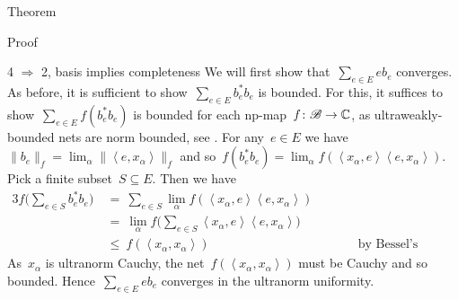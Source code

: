 \documentclass[b]{subfiles}
\begin{document}
\begin{parsec}
\begin{point}{Theorem}
\begin{point}{Proof}
\begin{point}{4 $\Rightarrow$ 2, basis implies completeness}
We will first show that~$\sum_{e \in E} e b_e$ converges.
As before, it is sufficient to show~$\sum_{e \in E} b_e^*b_e$ is bounded.
For this, it suffices to show~$\sum_{e\in E} f( b_e^*b_e ) $ is bounded
        for each np-map~$f\colon \mathscr{B} \to \mathbb{C}$,
    as ultraweakly-bounded nets are norm bounded,
    see .
For any~$e \in E$
    we have~$\|b_e\|_f = \lim_\alpha \|\left<e,x_\alpha\right>\|_f$
    and so~$f(b_e^*b_e) =\lim_\alpha f(\left<x_\alpha,e\right> \left<e, x_\alpha\right>)$.
    Pick a finite subset~$S \subseteq E$. Then we have
\begin{alignat*}{3}
    f\bigl(\sum_{e \in S} b_e^*b_e\bigr)
    &\ =\  \sum_{e \in S} \lim_\alpha 
     f(\left<x_\alpha,e\right> \left<e, x_\alpha\right>) \\
     &\  = \ \lim_\alpha 
            f\bigl(\sum_{e \in S}\left<x_\alpha,e\right>
                \left<e, x_\alpha\right>\bigr) \\
            &\ \leq\  f(\left<x_\alpha,x_\alpha\right>)
                &\qquad&\text{by Bessel's inequality.}
 \end{alignat*}
As~$x_\alpha$ is ultranorm Cauchy,
the net~$f(\left<x_\alpha,x_\alpha\right>)$
    must be Cauchy and so bounded.
Hence~$\sum_{e \in E} e b_e$ converges in the ultranorm uniformity.


\end{point}
\end{point}
\end{point}
\end{parsec}
\end{document}

